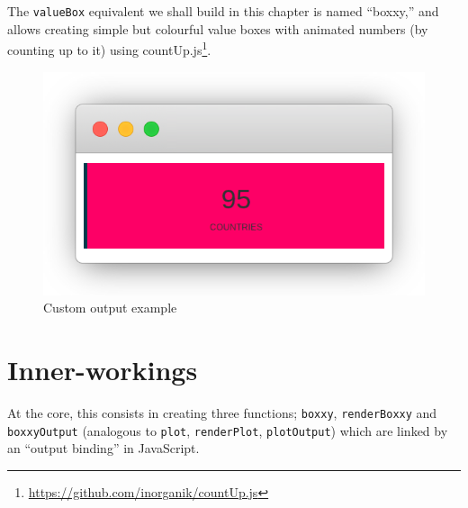 \documentclass[
]{krantz}
\makeatletter
\newenvironment{Shaded}{\begin{snugshade}}{\end{snugshade}}
\newcommand{\ControlFlowTok}[1]{\textcolor[rgb]{0.27,0.27,0.27}{\textbf{#1}}}
\newcommand{\DecValTok}[1]{\textcolor[rgb]{0.06,0.06,0.06}{#1}}
\newcommand{\KeywordTok}[1]{\textcolor[rgb]{0.27,0.27,0.27}{\textbf{#1}}}
\newcommand{\NormalTok}[1]{#1}
\newcommand{\OperatorTok}[1]{\textcolor[rgb]{0.43,0.43,0.43}{\textbf{#1}}}
\newcommand{\StringTok}[1]{\textcolor[rgb]{0.5,0.5,0.5}{#1}}
\renewcommand{\href}[2]{#2\footnote{\url{#1}}}
\newenvironment{kframe}{%
\medskip{}
\setlength{\fboxsep}{.8em}
 \def\at@end@of@kframe{}%
 \ifinner\ifhmode%
  \def\at@end@of@kframe{\end{minipage}}%
  \begin{minipage}{\columnwidth}%
 \fi\fi%
 \def\FrameCommand##1{\hskip\@totalleftmargin \hskip-\fboxsep
 \colorbox{shadecolor}{##1}\hskip-\fboxsep
     \hskip-\linewidth \hskip-\@totalleftmargin \hskip\columnwidth}%
 \MakeFramed {\advance\hsize-\width
   \@totalleftmargin\z@ \linewidth\hsize
   \@setminipage}}%
 {\par\unskip\endMakeFramed%
 \at@end@of@kframe}
\renewenvironment{Shaded}{\begin{kframe}}{\end{kframe}}
\makeatother
\begin{document}
The \texttt{valueBox} equivalent we shall build in this chapter is named ``boxxy,'' and allows creating simple but colourful value boxes with animated numbers (by counting up to it) using \href{https://github.com/inorganik/countUp.js}{countUp.js}.

\begin{Shaded}
\end{Shaded}

\begin{figure}
\centering
\includegraphics{images/boxxy-example.png}
\caption{Custom output example}
\end{figure}

\hypertarget{shiny-output-inner-workings}{%
\section{Inner-workings}\label{shiny-output-inner-workings}}

At the core, this consists in creating three functions; \texttt{boxxy}, \texttt{renderBoxxy} and \texttt{boxxyOutput} (analogous to \texttt{plot}, \texttt{renderPlot}, \texttt{plotOutput}) which are linked by an ``output binding'' in JavaScript.
\end{document}

